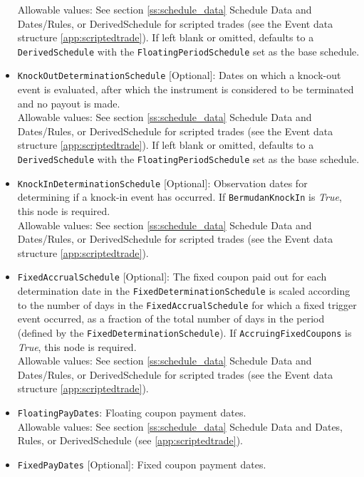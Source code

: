 \begin{itemize}
    Allowable values: See section \ref{ss:schedule_data} Schedule Data and Dates/Rules, or
    DerivedSchedule for scripted trades (see the Event data structure \ref{app:scriptedtrade}).
    If left blank or omitted, defaults to a \lstinline!DerivedSchedule! with the
    \lstinline!FloatingPeriodSchedule! set as the base schedule.
  \item \lstinline!KnockOutDeterminationSchedule! [Optional]: Dates on which a knock-out
  event is evaluated, after which the instrument is considered to be terminated and no
  payout is made. \\
    Allowable values: See section \ref{ss:schedule_data} Schedule Data and Dates/Rules, or
    DerivedSchedule for scripted trades (see the Event data structure \ref{app:scriptedtrade}).
    If left blank or omitted, defaults to a \lstinline!DerivedSchedule! with the
    \lstinline!FloatingPeriodSchedule! set as the base schedule.
  \item \lstinline!KnockInDeterminationSchedule! [Optional]: Observation dates for
  determining if a knock-in event has occurred. If \lstinline!BermudanKnockIn!
  is \emph{True}, this node is required. \\
    Allowable values: See section \ref{ss:schedule_data} Schedule Data and Dates/Rules, or
    DerivedSchedule for scripted trades (see the Event data structure \ref{app:scriptedtrade}).
  \item \lstinline!FixedAccrualSchedule! [Optional]: The fixed coupon paid out for each determination date
  in the \lstinline!FixedDeterminationSchedule! is scaled according to the number of days
  in the \lstinline!FixedAccrualSchedule! for which a fixed trigger event occurred, as a fraction of
  the total number of days in the period (defined by the
  \lstinline!FixedDeterminationSchedule!). If \lstinline!AccruingFixedCoupons! is
  \emph{True}, this node is required. \\
    Allowable values: See section \ref{ss:schedule_data} Schedule Data and Dates/Rules, or
    DerivedSchedule for scripted trades (see the Event data structure \ref{app:scriptedtrade}).
  \item \lstinline!FloatingPayDates!: Floating coupon payment dates. \\
    Allowable values: See section \ref{ss:schedule_data} Schedule Data and Dates, Rules, or
    DerivedSchedule (see \ref{app:scriptedtrade}).
  \item \lstinline!FixedPayDates! [Optional]: Fixed coupon payment dates. \\

\end{itemize}
